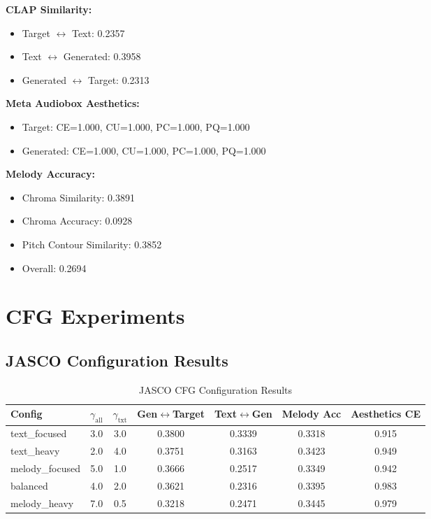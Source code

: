 \documentclass{article}
\begin{document}
\begin{CJK}{UTF8}{bsmi}
\textbf{CLAP Similarity:}
\begin{itemize}
    \item Target $\leftrightarrow$ Text: 0.2357
    \item Text $\leftrightarrow$ Generated: 0.3958
    \item Generated $\leftrightarrow$ Target: 0.2313
\end{itemize}

\textbf{Meta Audiobox Aesthetics:}
\begin{itemize}
    \item Target: CE=1.000, CU=1.000, PC=1.000, PQ=1.000
    \item Generated: CE=1.000, CU=1.000, PC=1.000, PQ=1.000
\end{itemize}

\textbf{Melody Accuracy:}
\begin{itemize}
    \item Chroma Similarity: 0.3891
    \item Chroma Accuracy: 0.0928
    \item Pitch Contour Similarity: 0.3852
    \item Overall: 0.2694
\end{itemize}

\section{CFG Experiments}

\subsection{JASCO Configuration Results}

\begin{table}[h]
\centering
\caption{JASCO CFG Configuration Results}
\label{tab:jasco_cfg}
\begin{tabular}{lcccccc}
\toprule
Config & $\gamma_{\text{all}}$ & $\gamma_{\text{txt}}$ & Gen$\leftrightarrow$Target & Text$\leftrightarrow$Gen & Melody Acc & Aesthetics CE \\
\midrule
text\_focused & 3.0 & 3.0 & 0.3800 & 0.3339 & 0.3318 & 0.915 \\
text\_heavy & 2.0 & 4.0 & 0.3751 & 0.3163 & 0.3423 & 0.949 \\
melody\_focused & 5.0 & 1.0 & 0.3666 & 0.2517 & 0.3349 & 0.942 \\
balanced & 4.0 & 2.0 & 0.3621 & 0.2316 & 0.3395 & 0.983 \\
melody\_heavy & 7.0 & 0.5 & 0.3218 & 0.2471 & 0.3445 & 0.979 \\
\bottomrule
\end{tabular}
\end{table}


\end{CJK}
\end{document}
